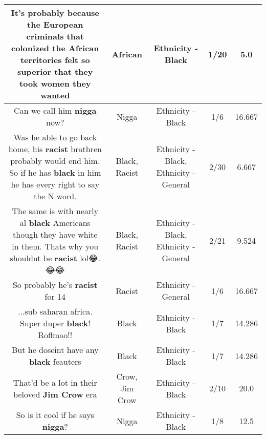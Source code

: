 \documentclass[11pt]{article}
\newlength\mylength
\begin{document}
\begin{center}
\begin{longtable}{|C{.65\mylength}|C{.30\mylength}|C{.12\mylength}|C{.12\mylength}|C{.12\mylength}|}
  \small It's probably because the European criminals that colonized the \textbf{African} territories felt so superior that they took women they wanted\normalsize   & African & Ethnicity - Black & 1/20 & 5.0 \\  \hline
  \small Can we call him \textbf{nigga} now?\normalsize   & Nigga & Ethnicity - Black & 1/6 & 16.667 \\  \hline
  \small Was he able to go back home, his \textbf{racist} brathren probably would end him. So if he has \textbf{black} in him he has every right to say the N word.\normalsize   & Black, Racist & Ethnicity - Black, Ethnicity - General & 2/30 & 6.667 \\  \hline
  \small The same is with nearly al \textbf{black} Americans though they have white in them. Thats why you shouldnt be \textbf{racist} lol😂.😂😂\normalsize   & Black, Racist & Ethnicity - Black, Ethnicity - General & 2/21 & 9.524 \\  \hline
  \small So probably he's \textbf{racist} for 14\normalsize   & Racist & Ethnicity - General & 1/6 & 16.667 \\  \hline
  \small ...sub saharan africa.  Super duper \textbf{black}! Roflmao!!\normalsize   & Black & Ethnicity - Black & 1/7 & 14.286 \\  \hline
  \small But he doseint have any \textbf{black} feauters\normalsize   & Black & Ethnicity - Black & 1/7 & 14.286 \\  \hline
  \small That'd be a lot in their beloved \textbf{Jim C\textbf{row}} era\normalsize   & Crow, Jim Crow & Ethnicity - Black & 2/10 & 20.0 \\  \hline
  \small So is it cool if he says \textbf{nigga}?\normalsize   & Nigga & Ethnicity - Black & 1/8 & 12.5 \\  \hline

\end{longtable}
\end{center}
\end{document}
